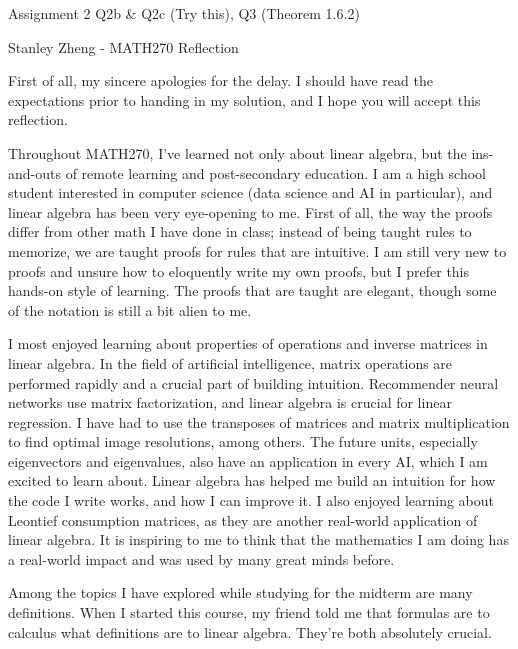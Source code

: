 \documentclass[11pt, letterpaper, twoside]{article}
\begin{document}
Assignment 2 Q2b \& Q2c (Try this), Q3 (Theorem 1.6.2)

\pagebreak

Stanley Zheng - MATH270 Reflection

\vspace{2mm}
First of all, my sincere apologies for the delay. I should have read the expectations prior to handing in my solution, and I hope you will accept this reflection.

\vspace{2mm}
Throughout MATH270, I've learned not only about linear algebra, but the ins-and-outs of remote learning and post-secondary education. 
I am a high school student interested in computer science (data science and AI in particular), and linear algebra has been very eye-opening to me. First of all, the way the proofs differ from other math I have done in class; instead of being taught rules to memorize, we are taught proofs for rules that are intuitive. 
I am still very new to proofs and unsure how to eloquently write my own proofs, but I prefer this hands-on style of learning. 
The proofs that are taught are elegant, though some of the notation is still a bit alien to me.

\vspace{2mm}
I most enjoyed learning about properties of operations and inverse matrices in linear algebra. 
In the field of artificial intelligence, matrix operations are performed rapidly and a crucial part of building intuition. 
Recommender neural networks use matrix factorization, and linear algebra is crucial for linear regression. 
I have had to use the transposes of matrices and matrix multiplication to find optimal image resolutions, among others. 
The future units, especially eigenvectors and eigenvalues, also have an application in every AI, which I am excited to learn about.
Linear algebra has helped me build an intuition for how the code I write works, and how I can improve it. 
I also enjoyed learning about Leontief consumption matrices, as they are another real-world application of linear algebra. 
It is inspiring to me to think that the mathematics I am doing has a real-world impact and was used by many great minds before. 

\vspace{2mm}
Among the topics I have explored while studying for the midterm are many definitions. 
When I started this course, my friend told me that formulas are to calculus what definitions are to linear algebra. 
They're both absolutely crucial. 
\end{document}
